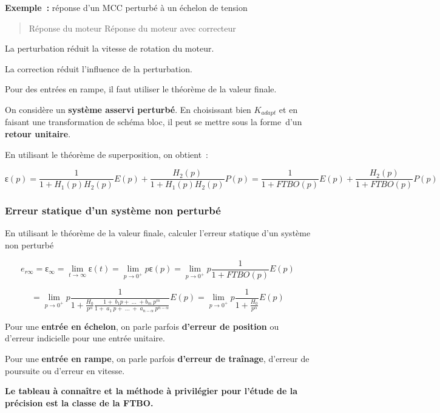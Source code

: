 \textbf{Exemple~:} réponse d'un MCC perturbé à un échelon de tension

\begin{quote}
Réponse du moteur Réponse du moteur avec correcteur
\end{quote}

La perturbation réduit la vitesse de rotation du moteur.

La correction réduit l'influence de la perturbation.

Pour des entrées en rampe, il faut utiliser le théorème de la valeur finale.

On considère un \textbf{système asservi perturbé}. En choisissant bien \(K_{adapt}\) et en faisant une transformation de schéma bloc, il peut se mettre sous la forme~d'un \textbf{retour unitaire}.

En utilisant le théorème de superposition, on obtient~:

\[ɛ(p) = \frac{1}{1 + H_{1}(p)H_{2}(p)}E(p) + \frac{H_{2}(p)}{1 + H_{1}(p)H_{2}(p)}P(p) = \frac{1}{1 + FTBO(p)}E(p) + \frac{H_{2}(p)}{1 + FTBO(p)}P(p)\]

\hypertarget{erreur-statique-dun-systuxe8me-non-perturbuxe9}{%
\subsubsection{Erreur statique d'un système non perturbé}\label{erreur-statique-dun-systuxe8me-non-perturbuxe9}}

En utilisant le théorème de la valeur finale, calculer l'erreur statique d'un système non perturbé

\[e_{r\infty} = ɛ_{\infty} = \lim_{t \rightarrow \infty}{ɛ(t)} = \lim_{p \rightarrow 0^{+}}{pɛ(p)} = \lim_{p \rightarrow 0^{+}}{p\frac{1}{1 + FTBO(p)}E(p)}\]

\[= \lim_{p \rightarrow 0^{+}}{p\frac{1}{1 + \frac{H_{0}}{p^{\alpha}}\frac{1 + \ b_{1}p + \ \ldots\  + b_{m}{\ p}^{m}}{1 + \ a_{1}\ p + \ \ldots\  + \ a_{n - \alpha}{\ p}^{n - \alpha}}}E(p)} = \lim_{p \rightarrow 0^{+}}{p\frac{1}{1 + \frac{H_{0}}{p^{\alpha}}}E(p)}\]

Pour une \textbf{entrée en échelon}, on parle parfois \textbf{d'erreur de position} ou d'erreur indicielle pour une entrée unitaire.

Pour une \textbf{entrée en rampe}, on parle parfois \textbf{d'erreur de traînage}, d'erreur de poursuite ou d'erreur en vitesse.

\textbf{Le tableau à connaître et la méthode à privilégier pour l'étude de la précision est la classe de la FTBO.}

